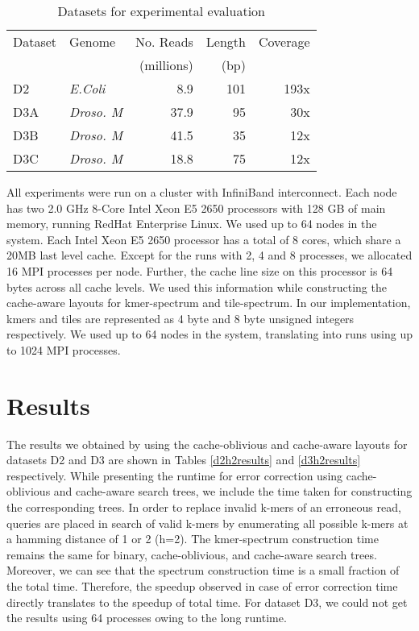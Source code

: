 \documentclass[10pt, conference]{IEEEtran}
\begin{document}
\begin{table}[htb]
\caption{\label{tab:datasets}Datasets for experimental evaluation}
\centering
\begin{tabular}{llrrr}
\hline
Dataset & Genome          & No. Reads  & Length       & Coverage \\
        &                 & (millions) & (bp) &          \\
\hline
D2      & \emph{E.Coli}   & 8.9        & 101          & 193x     \\
D3A     & \emph{Droso. M} & 37.9       & 95           & 30x      \\
D3B     & \emph{Droso. M} & 41.5       & 35           & 12x      \\
D3C     & \emph{Droso. M} & 18.8       & 75           & 12x      \\
\hline
\end{tabular}
\end{table}

All experiments were run on a cluster with InfiniBand interconnect. Each node has two  2.0 GHz 8-Core Intel Xeon E5 2650 processors with 128 GB of main memory, running RedHat Enterprise Linux.  We used up to 64 nodes in the system. Each Intel Xeon E5 2650 processor has a total of 8 cores, which share a 20MB last level cache. Except for the runs with 2, 4 and 8 processes, we allocated 16 MPI processes per node. Further, the cache line size on this processor is 64 bytes across all cache levels. We used this information while constructing the cache-aware layouts for kmer-spectrum and tile-spectrum. In our implementation, kmers and tiles are represented as 4 byte and 8 byte unsigned integers respectively. We used up to 64 nodes in the system, translating into runs using up to 1024 MPI processes.


\section{Results} \label{sec_Results}
The results we obtained by using the cache-oblivious and cache-aware layouts for datasets D2 and D3 are shown in Tables \ref{d2h2results} and \ref{d3h2results} respectively. While presenting the runtime for error correction using cache-oblivious and cache-aware search trees, we include the time taken for constructing the corresponding trees. In order to replace invalid k-mers of an erroneous read, queries are placed in search of valid k-mers by enumerating all possible k-mers at a hamming distance of 1 or 2 (h=2). The kmer-spectrum construction time remains the same for binary, cache-oblivious, and cache-aware search trees. Moreover, we can see that the spectrum construction time is a small fraction of the total time. Therefore, the speedup observed in case of error correction time directly translates to the speedup of total time. For dataset D3, we could not get the results using 64 processes owing to the long runtime.
\end{document}
